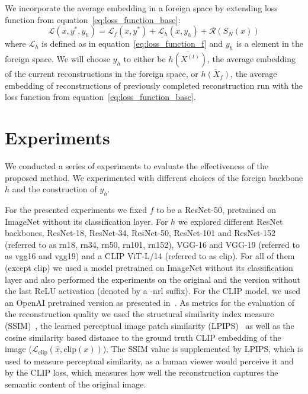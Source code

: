 \documentclass[10pt,twocolumn]{article}
\begin{document}
We incorporate the average embedding in a foreign space by extending loss function from equation~\ref{eq:loss_function_base}:
\begin{equation}\label{eq:loss_function}
\mathcal{L}(x, y^*, y_h) = \mathcal{L}_{f}(x, y^*) + \mathcal{L}_{h}(x, y_h) + \mathcal{R}(S_N(x))
\end{equation}
where $\mathcal{L}_{h}$ is defined as in equation~\ref{eq:loss_function_f} and $y_h$ is a element in the foreign space.
We will choose $y_h$ to either be $\overline{h(X^{(t)})}$, the average embedding of the current reconstructions in the foreign space, or $\overline{h(X_f)}$, the average embedding of reconstructions of previously completed reconstruction run with the loss function from equation~\ref{eq:loss_function_base}.

\section{Experiments}
We conducted a series of experiments to evaluate the effectiveness of the proposed method.
We experimented with different choices of the foreign backbone $h$ and the construction of $y_h$.

For the presented experiments we fixed $f$ to be a ResNet-50, pretrained on ImageNet without its classification layer.
For $h$ we explored different ResNet backbones, ResNet-18, ResNet-34, ResNet-50, ResNet-101 and ResNet-152 (referred to as rn18, rn34, rn50, rn101, rn152), VGG-16 and VGG-19 (referred to as vgg16 and vgg19) and a CLIP ViT-L/14 (referred to as clip).
For all of them (except clip) we used a model pretrained on ImageNet without its classification layer and also performed the experiments on the original and the version without the last ReLU activation (denoted by a -nrl suffix).
For the CLIP model, we used an OpenAI pretrained version as presented in~\cite{radfordLearningTransferableVisual2021}.
As metrics for the evaluation of the reconstruction quality we used the structural similarity index measure (SSIM)~\cite{zhouwangImageQualityAssessment2004}, the learned perceptual image patch similarity (LPIPS)~\cite{zhangUnreasonableEffectivenessDeep2018} as well as the cosine similarity based distance to the ground truth CLIP embedding of the image ($\mathcal{L}_{\text{clip}}(\hat x, \text{clip}(x))$).
The SSIM value is supplemented by LPIPS, which is used to measure perceptual similarity, as a human viewer would perceive it and by the CLIP loss, which measures how well the reconstruction captures the semantic content of the original image.
\end{document}
